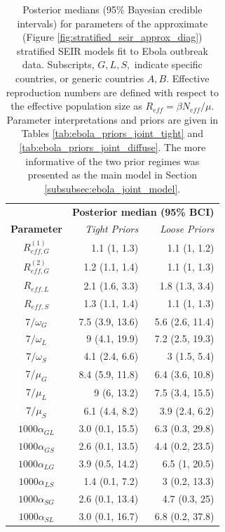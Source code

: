 \begin{table}[htbp]
	\caption[Posterior parameter estimates for stratified SEIR models fit Ebola outbreak data.]{Posterior medians (95\% Bayesian credible intervals) for parameters of the approximate (Figure \ref{fig:stratified_seir_approx_diag}) stratified SEIR models fit to Ebola outbreak data. Subscripts, $ G,L,S, $ indicate specific countries, or generic countries $ A,B $. Effective reproduction numbers are defined with respect to the effective population size as $ R_{eff} = \beta N_{eff} /\mu $. Parameter interpretations and priors are given in Tables \ref{tab:ebola_priors_joint_tight} and \ref{tab:ebola_priors_joint_diffuse}. The more informative of the two prior regimes was presented as the main model in Section \ref{subsubsec:ebola_joint_model}.}
	\label{tab:ebola_joint_ests}
	\centering\footnotesize
	\begin{tabular}{crr}
		\hline
		& \multicolumn{2}{c}{\textbf{Posterior median (95\% BCI)}}\\\cline{2-3}
		\textbf{Parameter} & \textit{Tight Priors} & \textit{Loose Priors} \\ 
		\hline
		$ R_{eff,G}^{(1)} $& 1.1 (1, 1.3) & 1.1 (1, 1.2) \\ 
		$ R_{eff,G}^{(2)} $& 1.2 (1.1, 1.4) & 1.1 (1, 1.3) \\ 
		$ R_{eff,L} $& 2.1 (1.6, 3.3) & 1.8 (1.3, 3.4) \\ 
		$ R_{eff,S} $& 1.3 (1.1, 1.4) & 1.1 (1, 1.3) \\ 
		$ 7/\omega_G $& 7.5 (3.9, 13.6) & 5.6 (2.6, 11.4) \\ 
		$ 7/\omega_L $& 9 (4.1, 19.9) & 7.2 (2.5, 19.3) \\ 
		$ 7/\omega_S $& 4.1 (2.4, 6.6) & 3 (1.5, 5.4) \\ 
		$ 7/\mu_G $& 8.4 (5.9, 11.8) & 6.4 (3.6, 10.8) \\ 
		$ 7/\mu_L $& 9 (6, 13.2) & 7.5 (3.4, 15.5) \\ 
		$ 7/\mu_S $& 6.1 (4.4, 8.2) & 3.9 (2.4, 6.2) \\ 
		$ 1000\alpha_{GL} $& 3.0 (0.1, 15.5) & 6.3 (0.3, 29.8) \\ 
		$ 1000\alpha_{GS} $& 2.6 (0.1, 13.5) & 4.4 (0.2, 23.5) \\ 
		$ 1000\alpha_{LG} $& 3.9 (0.5, 14.2) & 6.5 (1, 20.5) \\ 
		$ 1000\alpha_{LS} $& 1.4 (0.1, 7.2) & 3 (0.2, 13.3) \\ 
		$ 1000\alpha_{SG} $& 2.6 (0.1, 13.4) & 4.7 (0.3, 25) \\ 
		$ 1000\alpha_{SL} $& 3.0 (0.1, 16.7) & 6.8 (0.2, 37.8) \\ 

\end{tabular}
\end{table}
